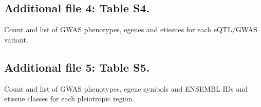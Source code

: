 \begin{backmatter}
\subsection*{Additional file 4: Table S4.}
Count and list of GWAS phenotypes, egenes and etissues for each eQTL/GWAS variant.

\subsection*{Additional file 5: Table S5.}
Count and list of GWAS phenotypes, egene symbols and ENSEMBL IDs and etissue classes for each pleiotropic region.

\end{backmatter}
